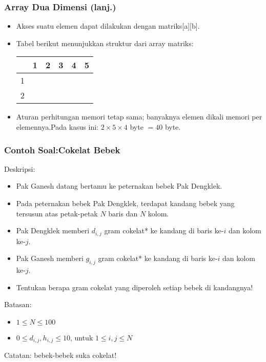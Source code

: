 \begin{frame}
\frametitle{Array Dua Dimensi (lanj.)}
\begin{itemize}
  \item Akses suatu elemen dapat dilakukan dengan matriks[a][b].
  \item Tabel berikut menunjukkan struktur dari array matriks:
  \begin{table}[h]
    \begin{tabular}{c|c|c|c|c|c|}
        & 1 & 2 & 3 & 4 & 5\\
      \hline 1 & & & & & \\
      \hline 2 & & & & & \\
      \hline
    \end{tabular}
  \end{table}
  \item Aturan perhitungan memori tetap sama; banyaknya elemen dikali memori per elemennya.\newline Pada kasus ini: $2 \times 5 \times 4$ byte $= 40$ byte.
\end{itemize}
\end{frame}

\begin{frame}
\frametitle{Contoh Soal:\newline Cokelat Bebek}
Deskripsi:
\begin{itemize}
  \item Pak Ganesh datang bertamu ke peternakan bebek Pak Dengklek.
  \item Pada peternakan bebek Pak Dengklek, terdapat kandang bebek yang tersusun atas petak-petak $N$ baris dan $N$ kolom.
  \item Pak Dengklek memberi $d_{i,j}$ gram cokelat* ke kandang di baris ke-$i$ dan kolom ke-$j$.
  \item Pak Ganesh memberi $g_{i,j}$ gram cokelat* ke kandang di baris ke-$i$ dan kolom ke-$j$.
  \item Tentukan berapa gram cokelat yang diperoleh setiap bebek di kandangnya!
\end{itemize}
Batasan:
\begin{itemize}
  \item $1 \le N \le 100$
  \item $0 \le d_{i,j}, h_{i,j} \le 10$, untuk $1 \le i,j \le N$
\end{itemize}

\tiny *Catatan: bebek-bebek suka cokelat!
\end{frame}

